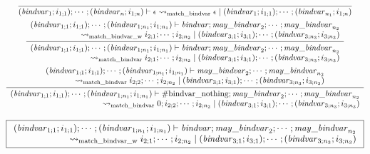 \begin{gather*}
    \infer{(\mathit{bindvar}_1; i_{1;1}); \cdots; (\mathit{bindvar}_n; i_{1;n}) \vdash \epsilon \rightsquigarrow_\mathrm{match\_bindvar} \epsilon \mid (\mathit{bindvar}_1; i_{1;1}); \cdots; (\mathit{bindvar}_{n_1}; i_{1;n})}{}
    \\
    \infer{\begin{array}{r}
        (\mathit{bindvar}_{1;1}; i_{1;1}); \cdots; (\mathit{bindvar}_{1;n_1}; i_{1;n_1}) \vdash \mathit{bindvar}; \mathit{may\_bindvar}_2; \cdots; \mathit{may\_bindvar}_{n_2}
        \\
        \rightsquigarrow_\mathrm{match\_bindvar} i_{2;1}; \cdots; i_{2;n_2} \mid (\mathit{bindvar}_{3;1}; i_{3;1}); \cdots; (\mathit{bindvar}_{3;n_3}; i_{3;n_3})
    \end{array}}{
        \begin{array}{r}
            (\mathit{bindvar}_{1;1}; i_{1;1}); \cdots; (\mathit{bindvar}_{1;n_1}; i_{1;n_1}) \vdash \mathit{bindvar}; \mathit{may\_bindvar}_2; \cdots; \mathit{may\_bindvar}_{n_2}
            \\
            \rightsquigarrow_\mathrm{match\_bindvar\_w} i_{2;1}; \cdots; i_{2;n_2} \mid (\mathit{bindvar}_{3;1}; i_{3;1}); \cdots; (\mathit{bindvar}_{3;n_3}; i_{3;n_3})
        \end{array}
    }
    \\
    \infer{\begin{array}{r}
        (\mathit{bindvar}_{1;1}; i_{1;1}); \cdots; (\mathit{bindvar}_{1;n_1}; i_{1;n_1}) \vdash \mathrm{\#bindvar\_nothing}; \mathit{may\_bindvar}_2; \cdots; \mathit{may\_bindvar}_{n_2}
        \\
        \rightsquigarrow_\mathrm{match\_bindvar} 0; i_{2;2}; \cdots; i_{2;n_2} \mid (\mathit{bindvar}_{3;1}; i_{3;1}); \cdots; (\mathit{bindvar}_{3;n_3}; i_{3;n_3})
    \end{array}}{
        \begin{array}{r}
            (\mathit{bindvar}_{1;1}; i_{1;1}); \cdots; (\mathit{bindvar}_{1;n_1}; i_{1;n_1}) \vdash \mathit{may\_bindvar}_2; \cdots; \mathit{may\_bindvar}_{n_2}
            \\
            \rightsquigarrow_\mathrm{match\_bindvar} i_{2;2}; \cdots; i_{2;n_2} \mid (\mathit{bindvar}_{3;1}; i_{3;1}); \cdots; (\mathit{bindvar}_{3;n_3}; i_{3;n_3})
        \end{array}
    }
\end{gather*}

$\fbox{$\begin{array}{r}
    (\mathit{bindvar}_{1;1}; i_{1;1}); \cdots; (\mathit{bindvar}_{1;n_1}; i_{1;n_1}) \vdash \mathit{bindvar}; \mathit{may\_bindvar}_2; \cdots; \mathit{may\_bindvar}_{n_2}
    \\
    \rightsquigarrow_\mathrm{match\_bindvar\_w} i_{2;1}; \cdots; i_{2;n_2} \mid (\mathit{bindvar}_{3;1}; i_{3;1}); \cdots; (\mathit{bindvar}_{3;n_3}; i_{3;n_3})
\end{array}$}$

